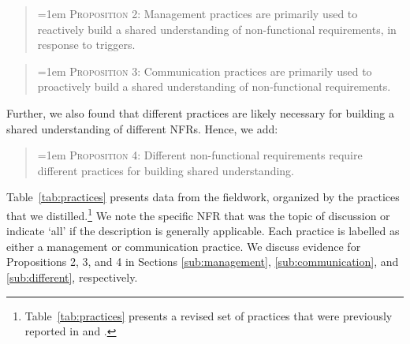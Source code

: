 \documentclass[smallextended]{svjour3}       %
\newcommand\cwproposition[2]{
\begin{quote}
\normalsize 
\vspace{0.5em}\hangindent=1em \textmd{\textsc{Proposition #1}: #2}\vspace{0.5em}
\end{quote}
}
\begin{document}
\cwproposition{2}{Management practices are primarily used to reactively build a shared understanding of non-functional requirements, in response to triggers.}


\cwproposition{3}{Communication practices are primarily used to proactively build a shared understanding of non-functional requirements.}
%
Further, we also found that different practices are likely necessary for building a shared understanding of different NFRs. Hence, we add:

\cwproposition{4}{Different non-functional requirements require different practices for building shared understanding.}


\noindent Table~\ref{tab:practices} presents data from the fieldwork, organized by the practices that we distilled.\footnote{Table~\ref{tab:practices} presents a revised set of practices that were previously reported in \cite{werner2020re,werner_tse_2021} and \cite{okpara_re2022,okpara_rej2023}.} We note the specific NFR that was the topic of discussion or indicate `all' if the description is generally applicable. Each practice is labelled as either a management or communication practice.
We discuss evidence for Propositions 2, 3, and 4 in Sections \ref{sub:management}, \ref{sub:communication}, and \ref{sub:different}, respectively.
\end{document}

